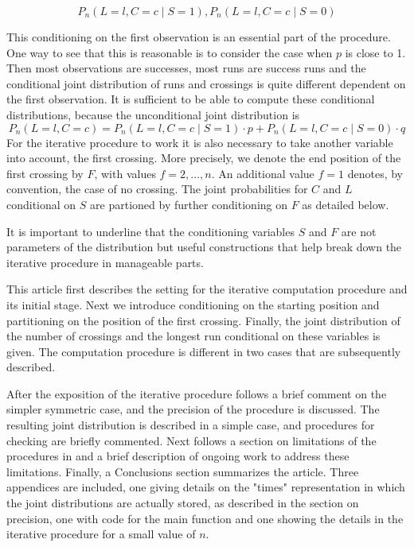 $$P_n (L=l,C=c \mid S=1), P_n (L=l,C=c \mid S=0)$$

This conditioning on the first observation is an essential part of the procedure. One way to see that this is reasonable is to consider the case when $p$ is close to 1. Then most observations are successes, most runs are success runs and the conditional joint distribution of runs and crossings is quite different dependent on the first observation. It is sufficient to be able to compute these conditional distributions, because the unconditional joint distribution is $$P_n (L=l,C=c) = P_n (L=l,C=c \mid S=1) \cdot p + P_n (L=l,C=c \mid S=0) \cdot q$$ For the iterative procedure to work it is also necessary to take another variable into account, the first crossing. More precisely, we denote the end position of the first crossing by $F$, with values $f=2, \ldots ,n$. An additional value $f=1$ denotes, by convention, the case of no crossing. The joint probabilities for $C$ and $L$ conditional on $S$ are partioned by further conditioning on $F$ as detailed below.

It is important to underline that the conditioning variables $S$ and $F$ are not parameters of the distribution but useful constructions that help break down the iterative procedure in manageable parts.

This article first describes the setting for the iterative computation procedure and its initial stage. Next we introduce conditioning on the starting position and partitioning on the position of the first crossing. Finally, the joint distribution of the number of crossings and the longest run conditional on these variables is given. The computation procedure is different in two cases that are subsequently described. 

After the exposition of the iterative procedure follows a brief comment on the simpler symmetric case, and the precision of the procedure is discussed. The resulting joint distribution is described in a simple case, and procedures for checking are briefly commented. Next follows a section on limitations of the procedures in  and a brief description of ongoing work to address these limitations. Finally, a Conclusions section summarizes the article. Three appendices are included, one giving details on the "times" representation in which the joint distributions are actually stored, as described in the section on precision, one with code for the main function  and one showing the details in the iterative procedure for a small value of $n$. 


